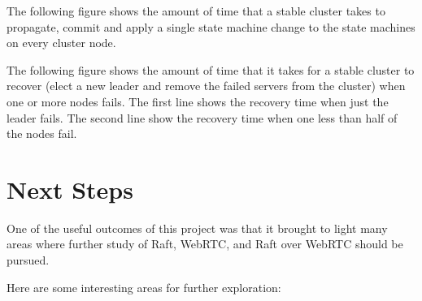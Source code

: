 \documentclass{acmtog} %
\begin{document}
The following figure shows the amount of time that a stable cluster takes to
propagate, commit and apply a single state machine change to the state
machines on every cluster node.


The following figure shows the amount of time that it takes for
a stable cluster to recover (elect a new leader and remove the failed
servers from the cluster) when one or more nodes fails. The first line
shows the recovery time when just the leader fails. The second line
show the recovery time when one less than half of the nodes fail.




\section{Next Steps}

One of the useful outcomes of this project was that it brought to
light many areas where further study of Raft, WebRTC, and Raft over
WebRTC should be pursued.

Here are some interesting areas for further exploration:
\end{document}
